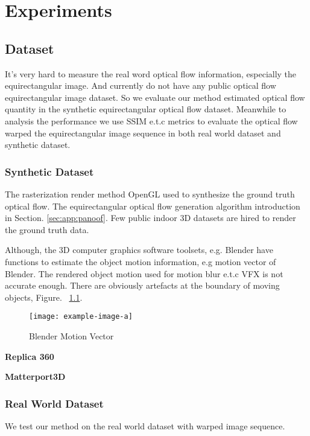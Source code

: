 \chapter{Experiments}


\section{Dataset}

It's very hard to measure the real word optical flow information, especially the equirectangular image. 
And currently do not have any public optical flow equirectangular image dataset.
So we evaluate our method estimated optical flow quantity in the synthetic equirectangular optical flow dataset.
Meanwhile to analysis the performance we use SSIM e.t.c metrics to evaluate the optical flow warped the equirectangular image sequence in both real world dataset and synthetic dataset.


\subsection{Synthetic Dataset}

The rasterization render method OpenGL used to synthesize the ground truth optical flow.
The equirectangular optical flow generation algorithm introduction in Section. \ref{sec:app:panoof}.
Few public indoor 3D datasets are hired to render the ground truth data.

Although, the 3D computer graphics software toolsets, e.g. Blender have functions to estimate the object motion information, e.g motion vector of Blender. 
The rendered object motion used for motion blur e.t.c VFX is not accurate enough. 
There are obviously artefacts at the boundary of moving objects, Figure. ~\ref{fig:exp:blendermv}. 

\begin{figure}[hbt!]
	\centering
	\texttt{[image: example-image-a]}
	\caption{Blender Motion Vector}
	\label{fig:exp:blendermv}
\end{figure}

\textbf{Replica 360} ~\citet{replica19arxiv}


\textbf{Matterport3D} ~\citet{Matterport3D}


\subsection{Real World Dataset}

We test our method on the real world dataset with warped image sequence.

